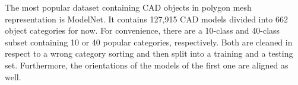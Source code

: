 The most popular dataset containing CAD objects in polygon mesh representation is ModelNet\cite{conf/cvpr/WuSKYZTX15}.
It contains 127,915 CAD models divided into 662 object categories for now.
For convenience, there are a 10-class and 40-class subset containing 10 or 40 popular categories, respectively.
Both are cleaned in respect to a wrong category sorting and then split into a training and a testing set.
Furthermore, the orientations of the models of the first one are aligned as well.